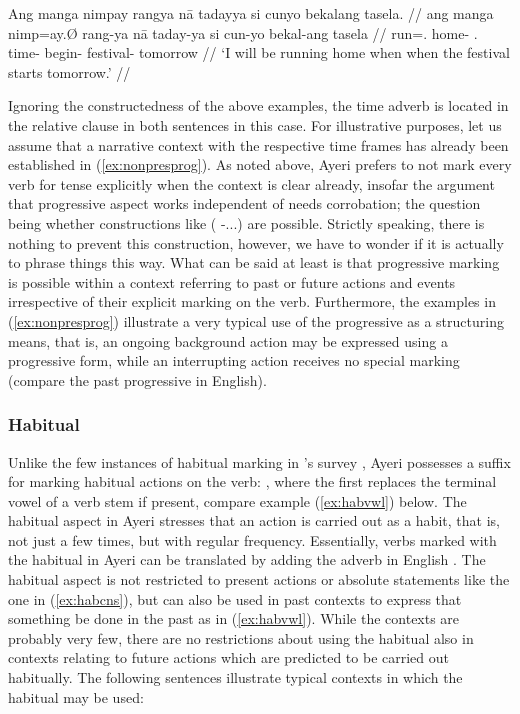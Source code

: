 \a\label{ex:futprog}\begingl
	\gla Ang manga nimpay rangya nā tadayya si cunyo bekalang tasela. //
	\glb ang manga nimp=ay.Ø rang-ya nā taday-ya si cun-yo bekal-ang 
		tasela //
	\glc \AgtT{} \Prog{} run=\Fsg{}.\Top{} home-\Loc{} \Fsg{}.\Gen{} 
		time-\Loc{} \Rel{} begin-\TsgN{} festival-\Aarg{} tomorrow //
	\glft `I will be running home when when the festival starts 
		tomorrow.' //
\endgl

\xe

Ignoring the constructedness of the above examples, the time adverb is located 
in the relative clause in both sentences in this case. For illustrative 
purposes, let us assume that a narrative context with the respective time 
frames has already been established in (\ref{ex:nonpresprog}). As noted above, 
Ayeri prefers to not mark every verb for tense explicitly when the context is 
clear already, insofar the argument that progressive aspect works independent 
of  needs corrobation; the question being whether constructions like 
 (\Prog{} \Pst{}-...) are possible. Strictly 
speaking, there is nothing to prevent this construction, however, we have to 
wonder if it is actually  to phrase things this way. What can be 
said at least is that progressive marking is possible within a context 
referring to past or future actions and events irrespective of their explicit 
marking on the verb. Furthermore, the examples in (\ref{ex:nonpresprog}) 
illustrate a very typical use of the progressive as a structuring means, that 
is, an ongoing background action may be expressed using a progressive form, 
while an interrupting action receives no special marking (compare the past 
progressive in English).


\subsubsection{Habitual}

Unlike the few instances of habitual marking in \citet{dahl1985}'s survey
\citep[96]{dahl1985}, Ayeri possesses a suffix for marking habitual actions on
the verb: , where the first  replaces the terminal vowel
of a verb stem if present, compare example (\ref{ex:habvwl}) below. The
habitual aspect in Ayeri stresses that an action is carried out as a habit,
that is, not just a few times, but with regular frequency. Essentially, verbs
marked with the habitual in Ayeri can be translated by adding the adverb
 in English \citep[97]{dahl1985}. The habitual aspect is not
restricted to present actions or absolute statements like the one in
(\ref{ex:habcns}), but can also be used in past contexts to express that
something  be done in the past as in (\ref{ex:habvwl}).
While the contexts are probably very few, there are no restrictions about using
the habitual also in contexts relating to future actions which are predicted to
be carried out habitually. The following sentences illustrate typical contexts
in which the habitual may be used:

